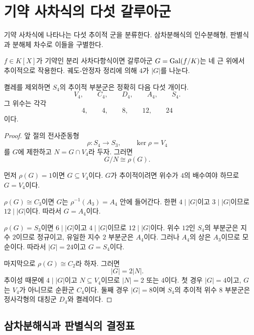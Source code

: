 \clearpage
\section{기약 사차식의 다섯 갈루아군}
\label{sec:quartic-group-classification}

\begin{learninggoal}
기약 사차식에 나타나는 다섯 추이적 군을 분류한다. 삼차분해식의 인수분해형, 판별식과 분해체 차수로 이들을 구별한다.
\end{learninggoal}

$f\in K[X]$가 기약인 분리 사차다항식이면 갈루아군 $G=\operatorname{Gal}(f/K)$는 네 근 위에서 추이적으로 작용한다. 궤도-안정자 정리에 의해 $4$가 $|G|$를 나눈다.

\begin{theorem}
\label{thm:transitive-subgroups-s4}
켤레를 제외하면 $S_4$의 추이적 부분군은 정확히 다음 다섯 개이다.
\[
  V_4,\qquad C_4,\qquad D_4,\qquad A_4,\qquad S_4.
\]
그 위수는 각각
\[
  4,\qquad4,\qquad8,\qquad12,\qquad24
\]
이다.
\end{theorem}

\begin{proof}
앞 절의 전사준동형
\[
  \rho:S_4\to S_3,
  \qquad \ker\rho=V_4
\]
를 $G$에 제한하고 $N=G\cap V_4$라 두자. 그러면
\[
  G/N\cong\rho(G).
\]

먼저 $\rho(G)=1$이면 $G\subseteq V_4$이다. $G$가 추이적이려면 위수가 $4$의 배수여야 하므로 $G=V_4$이다.

$\rho(G)\cong C_3$이면 $G$는 $\rho^{-1}(A_3)=A_4$ 안에 들어간다. 한편 $4\mid |G|$이고 $3\mid |G|$이므로 $12\mid |G|$이다. 따라서 $G=A_4$이다.

$\rho(G)=S_3$이면 $6\mid |G|$이고 $4\mid |G|$이므로 $12\mid |G|$이다. 위수 $12$인 $S_4$의 부분군은 지수 $2$이므로 정규이고, 유일한 지수 $2$ 부분군은 $A_4$이다. 그러나 $A_4$의 상은 $A_3$이므로 모순이다. 따라서 $|G|=24$이고 $G=S_4$이다.

마지막으로 $\rho(G)\cong C_2$라 하자. 그러면
\[
  |G|=2|N|.
\]
추이성 때문에 $4\mid|G|$이고 $N\subseteq V_4$이므로 $|N|=2$ 또는 $4$이다. 첫 경우 $|G|=4$이고, $G$는 $V_4$가 아니므로 순환군 $C_4$이다. 둘째 경우 $|G|=8$이며 $S_4$의 추이적 위수 $8$ 부분군은 정사각형의 대칭군 $D_4$와 켤레이다.
\end{proof}

\subsection{삼차분해식과 판별식의 결정표}

